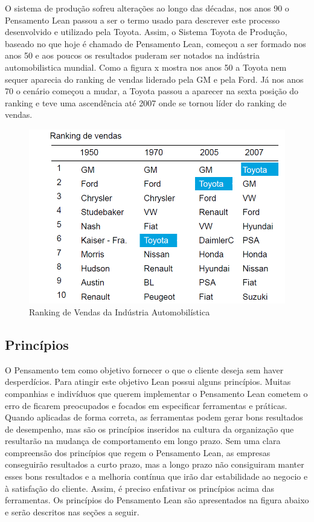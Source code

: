 O sistema de produção sofreu alterações ao longo das décadas, nos anos 90 o Pensamento Lean passou a ser o termo usado para descrever este processo desenvolvido e utilizado pela Toyota. Assim, o Sistema Toyota de Produção, baseado no que hoje é chamado de Pensamento Lean, começou a ser formado nos anos 50 e aos poucos os resultados puderam ser notados na indústria automobilistica mundial. Como a figura x mostra nos anos 50 a Toyota nem sequer aparecia do ranking de vendas liderado pela GM e pela Ford. Já nos anos 70 o cenário começou a mudar, a Toyota passou a aparecer na sexta posição do ranking e teve uma ascendência até 2007 onde se tornou líder do ranking de vendas.

\begin{figure}[h]
		\centering
		\label{fig01}
			\includegraphics[scale=0.5]{figuras/ranking.png}
		\caption{Ranking de Vendas da Indústria Automobilística}
\end{figure}

\subsection[Princípios]{Princípios}

O Pensamento tem como objetivo fornecer o que o cliente deseja sem haver desperdícios. Para atingir este objetivo Lean possui alguns princípios. Muitas companhias e indivíduos que querem implementar o Pensamento Lean cometem o erro de ficarem preocupados e focados em especificar ferramentas e práticas. Quando aplicadas de forma correta, as ferramentas podem gerar bons resultados de desempenho, mas são os princípios inseridos na cultura da organização que resultarão na mudança de comportamento em longo prazo. Sem uma clara compreensão dos princípios que regem o Pensamento Lean, as empresas conseguirão resultados a curto prazo, mas a longo prazo não consiguiram manter esses bons resultados e a melhoria contínua que irão dar estabilidade ao negocio e à satisfação do cliente. Assim, é preciso enfativar os princípios acima das ferramentas. Os princípios do Pensamento Lean são apresentados na figura abaixo e serão descritos nas seções a seguir.

